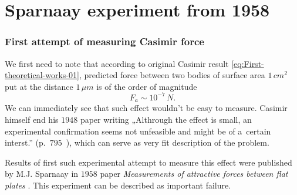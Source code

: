 \documentclass[10pt,t]{beamer}
\begin{document}
\section{Sparnaay experiment from 1958}


\begin{frame}
  \frametitle{First attempt of measuring Casimir force}


  We first need to note that according to original Casimir result
  \eqref{eq:First-theoretical-works-01},
  predicted force between two bodies of surface area $1 \, \si{cm}^{ 2 }$
  put at the distance $1 \, \mu\si{m}$ is of the order of magnitude
  \begin{equation}
    \label{eq:Sparnaay-experiment-from-ETC-01}
    F_{ a } \sim 10^{ -7 } \, \si{N}.
  \end{equation}
  We can immediately see that such effect wouldn't be easy to measure.
  Casimir himself end his $1948$ paper writing „Althrough the effect is
  small, an experimental confirmation seems not unfeasible and might be of
  a~certain interst.”
  (p.~$795$~\parencite{Casimir-On-the-Attraction-Between-ETC-Pub-1948}),
  which can serve as very fit description of the problem.

  Results of first such experimental attempt to measure this effect were
  published by M.J. Sparnaay in $1958$ paper \textit{Measurements of
    attractive forces between flat plates}
  \parencite{Sparnaay-Measurments-of-attractive-forces-ETC-Pub-1958}.
  This experiment can be described as important failure.







\end{frame}
\end{document}
